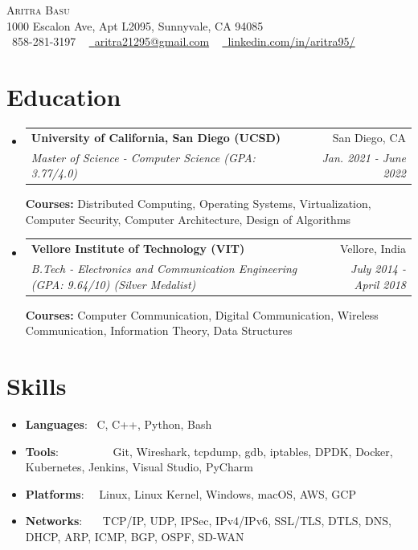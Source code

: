 \documentclass[a4paper,20pt]{article}
\makeatletter
\newcommand{\resumeItem}[2]{
  \item\small{
    \textbf{#1}{: #2 \vspace{-2pt}}
  }
}
\newcommand{\resumeSubheading}[4]{
  \vspace{-1pt}\item
    \begin{tabular*}{0.97\textwidth}{l@{\extracolsep{\fill}}r}
      \textbf{#1} & #2 \\
      \textit{#3} & \textit{#4} \\
    \end{tabular*}\vspace{-5pt}
}
\newcommand{\resumeSubItem}[2]{\resumeItem{#1}{#2}\vspace{-1pt}}
\newcommand{\resumeSubHeadingListStart}{\begin{itemize}[leftmargin=*]}
\newcommand{\resumeSubHeadingListEnd}{\end{itemize}}
\makeatother
\begin{document}
\begin{center}
    {\Huge \scshape Aritra Basu} \\ \vspace{2pt}
    1000 Escalon Ave, Apt L2095, Sunnyvale, CA 94085 \\ \vspace{2pt}
    \small \raisebox{-0.1\height}\faPhone\ 858-281-3197 ~ \href{mailto:x@gmail.com}{\raisebox{-0.2\height}\faEnvelope\  \underline{aritra21295@gmail.com}} ~ 
    \href{https://linkedin.com/in//}{\raisebox{-0.2\height}\faLinkedin\ \underline{linkedin.com/in/aritra95/}}  ~
\end{center}

\vspace{-2pt}
\section{Education}
    \resumeSubHeadingListStart
        \resumeSubheading
        {University of California, San Diego (UCSD)}{San Diego, CA}
        {Master of Science - Computer Science (GPA: 3.77/4.0)}{Jan. 2021 - June 2022}
        {\footnotesize {\newline \newline{}\textbf{Courses:} Distributed Computing, Operating Systems, Virtualization, Computer Security, Computer Architecture, Design of Algorithms}}
        \resumeSubheading
        {Vellore Institute of Technology (VIT)}{Vellore, India}
        {B.Tech - Electronics and Communication Engineering (GPA: 9.64/10) (Silver Medalist)}{July 2014 - April 2018}
        {\footnotesize {\newline \newline{}\textbf{Courses:} Computer Communication, Digital Communication, Wireless Communication, Information Theory, Data Structures}}
    \resumeSubHeadingListEnd

\section{Skills}
	\resumeSubHeadingListStart
	    \resumeSubItem{Languages}{~C, C++, Python, Bash}
	    \resumeSubItem{Tools}{~~~~~~~~~Git, Wireshark, tcpdump, gdb, iptables, DPDK, Docker, Kubernetes, Jenkins, Visual Studio, PyCharm}
	    \resumeSubItem{Platforms}{~~Linux, Linux Kernel, Windows, macOS, AWS, GCP}
	    \resumeSubItem{Networks}{~~~TCP/IP, UDP, IPSec, IPv4/IPv6, SSL/TLS, DTLS, DNS, DHCP, ARP, ICMP, BGP, OSPF, SD-WAN}
    \resumeSubHeadingListEnd
\end{document}
